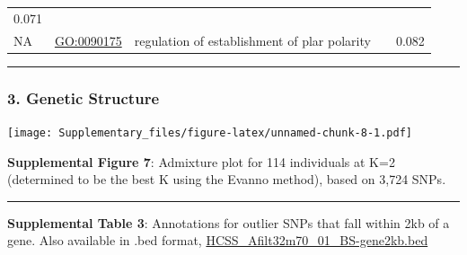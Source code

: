 \documentclass[
]{article}
\begin{document}
\begin{longtable}[]{@{}lllll@{}}
\begin{minipage}[t]{0.17\columnwidth}
0.071\strut
\end{minipage}\tabularnewline
\begin{minipage}[t]{0.17\columnwidth}\raggedright
NA\strut
\end{minipage} & \begin{minipage}[t]{0.17\columnwidth}\raggedright
\url{GO:0090175}\strut
\end{minipage} & \begin{minipage}[t]{0.17\columnwidth}\raggedright
regulation of establishment of plar polarity\strut
\end{minipage} & \begin{minipage}[t]{0.17\columnwidth}\raggedright
\strut
\end{minipage} & \begin{minipage}[t]{0.17\columnwidth}\raggedright
0.082\strut
\end{minipage}\tabularnewline
\bottomrule
\end{longtable}

\begin{center}\rule{0.5\linewidth}{0.5pt}\end{center}

\hypertarget{genetic-structure}{%
\subsubsection{3. Genetic Structure}\label{genetic-structure}}

\texttt{[image: Supplementary\_files/figure-latex/unnamed-chunk-8-1.pdf]}

\textbf{Supplemental Figure 7}: Admixture plot for 114 individuals at
K=2 (determined to be the best K using the Evanno method), based on
3,724 SNPs.

\begin{center}\rule{0.5\linewidth}{0.5pt}\end{center}

\textbf{Supplemental Table 3}: Annotations for outlier SNPs that fall
within 2kb of a gene. Also available in .bed format,
\href{https://github.com/sr320/paper-oly-mbdbs-gen/blob/master/analyses/analyses/2bRAD/PopGen/HCSS_Afilt32m70_01_BS-gene2kb.bed}{HCSS\_Afilt32m70\_01\_BS-gene2kb.bed}
\end{document}
